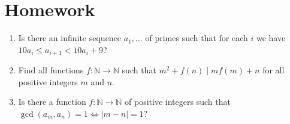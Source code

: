 \documentclass{article}
\newcommand\Nn{\mathbb{N}}
\begin{document}
\section{Homework}
\begin{enumerate}
	\item Is there an infinite sequence $a_1,\ldots$ of primes such that for each $i$ we
	      have $10 a_i\le a_{i+1}<10a_i+9$?
	\item Find all functions $f:\Nn\to\Nn$ such that $m^2+f(n)\mid
		      mf(m)+n$ for all positive integers $m$ and $n$.
	\item Is there a function $f:\Nn\to\Nn$ of positive integers such that
	      $\gcd(a_m,a_n)=1\iff |m-n|=1$?
\end{enumerate}
\end{document}
